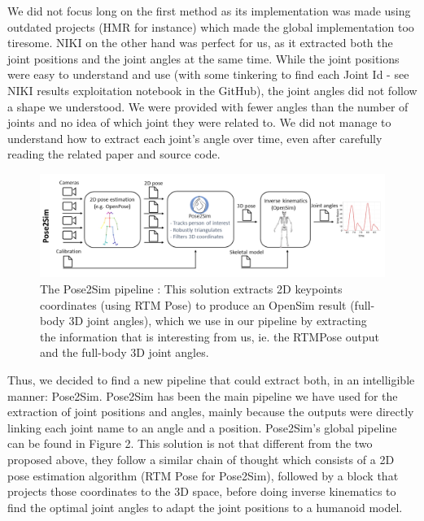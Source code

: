 \documentclass{amsart}
\theoremstyle{definition}
\theoremstyle{plain}
\begin{document}
We did not focus long on the first method as its implementation was made using outdated projects (HMR for instance) which made the global implementation too tiresome. NIKI on the other hand was perfect for us, as it extracted both the joint positions and the joint angles at the same time. While the joint positions were easy to understand and use (with some tinkering to find each Joint Id - see NIKI results exploitation notebook in the GitHub), the joint angles did not follow a shape we understood. We were provided with fewer angles than the number of joints and no idea of which joint they were related to. We did not manage to understand how to extract each joint's angle over time, even after carefully reading the related paper and source code. 
\\

\begin{figure}
  \includegraphics[width = 0.99 \columnwidth]{img/pose2sim_pipeline.png}
  \caption{The Pose2Sim pipeline : This solution extracts 2D keypoints coordinates (using RTM Pose\cite{RTMPose}) to produce an OpenSim result (full-body 3D joint angles), which we use in our pipeline by extracting the information that is interesting from us, ie. the RTMPose output and the full-body 3D joint angles. }
\end{figure}

Thus, we decided to find a new pipeline that could extract both, in an intelligible manner: Pose2Sim\cite{Pose2Sim}. Pose2Sim has been the main pipeline we have used for the extraction of joint positions and angles, mainly because the outputs were directly linking each joint name to an angle and a position. Pose2Sim's global pipeline can be found in Figure 2. This solution is not that different from the two proposed above, they follow a similar chain of thought which consists of a 2D pose estimation algorithm (RTM Pose\cite{RTMPose} for Pose2Sim), followed by a block that projects those coordinates to the 3D space, before doing inverse kinematics to find the optimal joint angles to adapt the joint positions to a humanoid model. 
\\
\end{document}
